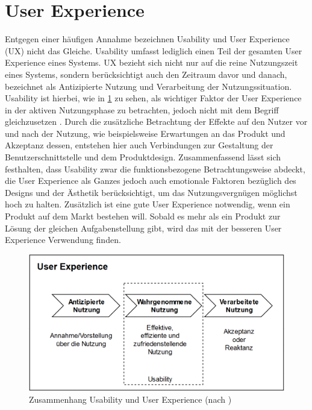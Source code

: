 \section{User Experience}
Entgegen einer häufigen Annahme bezeichnen Usability und User Experience (UX) nicht das Gleiche.
Usability umfasst lediglich einen Teil der gesamten User Experience eines Systems\cite{Knight.2019c}.
UX bezieht sich nicht nur auf die reine Nutzungszeit eines Systems, sondern berücksichtigt auch den Zeitraum davor und danach, bezeichnet als Antizipierte Nutzung und Verarbeitung der Nutzungssituation.
Usability ist hierbei, wie in \cref{fig:UX} zu sehen, als wichtiger Faktor der User Experience in der aktiven Nutzungsphase zu betrachten, jedoch nicht mit dem Begriff gleichzusetzen \cite{Sarodnick.2016}.
Durch die zusätzliche Betrachtung der Effekte auf den Nutzer vor und nach der Nutzung, wie beispielsweise Erwartungen an das Produkt und Akzeptanz dessen, entstehen hier auch Verbindungen zur Gestaltung der Benutzerschnittstelle und dem Produktdesign\cite{Richter.2016}.
Zusammenfassend lässt sich festhalten, dass Usability zwar die funktionsbezogene Betrachtungsweise abdeckt, die User Experience als Ganzes jedoch auch emotionale Faktoren bezüglich des Designs und der Ästhetik berücksichtigt, um das Nutzungsvergnügen möglichst hoch zu halten.
Zusätzlich ist eine gute User Experience notwendig, wenn ein Produkt auf dem Markt bestehen will.
Sobald es mehr als ein Produkt zur Lösung der gleichen Aufgabenstellung gibt, wird das mit der besseren User Experience Verwendung finden\cite{Knight.2019c}.


\begin{figure}[H]
\begin{center}
  \includegraphics[scale=0.5]{figures/UX2.png}
  \caption{Zusammenhang Usability und User Experience (nach \cite{Sarodnick.2016})}
  \label{fig:UX}
\end{center}
\end{figure}

